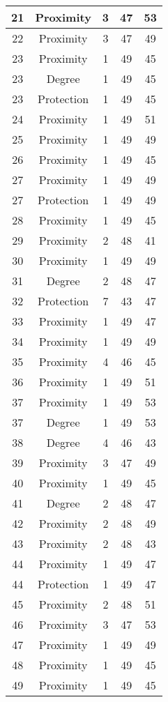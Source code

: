 \documentclass[results.tex]{subfiles}
\begin{document}
\begin{center}
\begin{tabular}{| c || c | c | c | c |}
    \hline
    21 & Proximity & 3 & 47 & 53 \\ 
    \hline
    22 & Proximity & 3 & 47 & 49 \\ 
    \hline
    23 & Proximity & 1 & 49 & 45 \\ 
    \hline
    23 & Degree & 1 & 49 & 45 \\ 
    \hline
    23 & Protection & 1 & 49 & 45 \\ 
    \hline
    24 & Proximity & 1 & 49 & 51 \\ 
    \hline
    25 & Proximity & 1 & 49 & 49 \\ 
    \hline
    26 & Proximity & 1 & 49 & 45 \\ 
    \hline
    27 & Proximity & 1 & 49 & 49 \\ 
    \hline
    27 & Protection & 1 & 49 & 49 \\ 
    \hline
    28 & Proximity & 1 & 49 & 45 \\ 
    \hline
    29 & Proximity & 2 & 48 & 41 \\ 
    \hline
    30 & Proximity & 1 & 49 & 49 \\ 
    \hline
    31 & Degree & 2 & 48 & 47 \\ 
    \hline
    32 & Protection & 7 & 43 & 47 \\ 
    \hline
    33 & Proximity & 1 & 49 & 47 \\ 
    \hline
    34 & Proximity & 1 & 49 & 49 \\ 
    \hline
    35 & Proximity & 4 & 46 & 45 \\ 
    \hline
    36 & Proximity & 1 & 49 & 51 \\ 
    \hline
    37 & Proximity & 1 & 49 & 53 \\ 
    \hline
    37 & Degree & 1 & 49 & 53 \\ 
    \hline
    38 & Degree & 4 & 46 & 43 \\ 
    \hline
    39 & Proximity & 3 & 47 & 49 \\ 
    \hline
    40 & Proximity & 1 & 49 & 45 \\ 
    \hline
    41 & Degree & 2 & 48 & 47 \\ 
    \hline
    42 & Proximity & 2 & 48 & 49 \\ 
    \hline
    43 & Proximity & 2 & 48 & 43 \\ 
    \hline
    44 & Proximity & 1 & 49 & 47 \\ 
    \hline
    44 & Protection & 1 & 49 & 47 \\ 
    \hline
    45 & Proximity & 2 & 48 & 51 \\ 
    \hline
    46 & Proximity & 3 & 47 & 53 \\ 
    \hline
    47 & Proximity & 1 & 49 & 49 \\ 
    \hline
    48 & Proximity & 1 & 49 & 45 \\ 
    \hline
    49 & Proximity & 1 & 49 & 45 \\ 
    \hline   \end{tabular}
\end{center}
\end{document}
